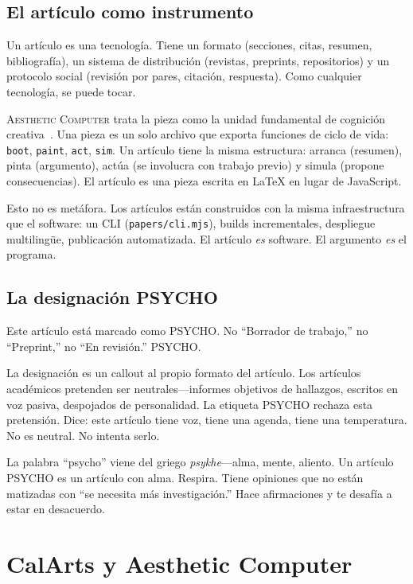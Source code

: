 \documentclass[10pt,letterpaper,twocolumn]{article}
\newcommand{\ac}{\textsc{Aesthetic Computer}}
\begin{document}
\subsection{El artículo como instrumento}

Un artículo es una tecnología. Tiene un formato (secciones, citas, resumen, bibliografía), un sistema de distribución (revistas, preprints, repositorios) y un protocolo social (revisión por pares, citación, respuesta). Como cualquier tecnología, se puede tocar.

\ac{} trata la pieza como la unidad fundamental de cognición creativa~\citep{scudder2026pieces}. Una pieza es un solo archivo que exporta funciones de ciclo de vida: \texttt{boot}, \texttt{paint}, \texttt{act}, \texttt{sim}. Un artículo tiene la misma estructura: arranca (resumen), pinta (argumento), actúa (se involucra con trabajo previo) y simula (propone consecuencias). El artículo es una pieza escrita en \LaTeX{} en lugar de JavaScript.

Esto no es metáfora. Los artículos están construidos con la misma infraestructura que el software: un CLI (\texttt{papers/cli.mjs}), builds incrementales, despliegue multilingüe, publicación automatizada. El artículo \emph{es} software. El argumento \emph{es} el programa.

\subsection{La designación PSYCHO}

Este artículo está marcado como PSYCHO. No ``Borrador de trabajo,'' no ``Preprint,'' no ``En revisión.'' PSYCHO.

La designación es un callout al propio formato del artículo. Los artículos académicos pretenden ser neutrales---informes objetivos de hallazgos, escritos en voz pasiva, despojados de personalidad. La etiqueta PSYCHO rechaza esta pretensión. Dice: este artículo tiene voz, tiene una agenda, tiene una temperatura. No es neutral. No intenta serlo.

La palabra ``psycho'' viene del griego \textit{psykhe}---alma, mente, aliento. Un artículo PSYCHO es un artículo con alma. Respira. Tiene opiniones que no están matizadas con ``se necesita más investigación.'' Hace afirmaciones y te desafía a estar en desacuerdo.

\section{CalArts y Aesthetic Computer}
\end{document}

